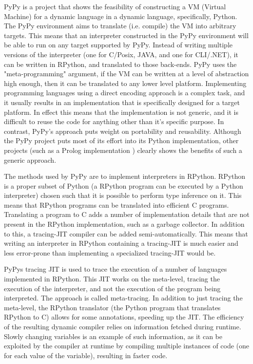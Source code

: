 PyPy is a project that shows the feasibility of constructing a VM (Virtual Machine) 
for a dynamic  language in a dynamic language, specifically, Python. The PyPy 
environment aims to translate (i.e. compile) the VM into arbitrary targets. This 
means that an interpreter constructed in the PyPy environment will be able to 
run on any target supported by PyPy. Instead of writing multiple versions of 
the interpreter (one for C/Posix, JAVA, and one for CLI/.NET), it can be 
written in RPython, and translated to those back-ends. PyPy uses the 
"meta-programming" argument, if the VM can be written at a level of abstraction 
high enough, then it can be translated to any lower level platform. Implementing 
programming languages using a direct encoding approach is a complex task, and it 
usually results in an implementation that is specifically designed for a target platform. 
In effect this means that the implementation is not generic, and it is difficult to 
reuse the code for anything other than it's specific purpose. In contrast, 
PyPy's approach puts weight on portability and reusability\cite{pypy}. Although the
PyPy project puts most of its effort into its Python implementation, other projects
(such as a Prolog implementation \cite{bolz2010towards}) clearly shows the benefits of
such a generic approach.

The methods used by PyPy are to implement interpreters in RPython. RPython is a proper 
subset of Python (a RPython program can be executed by a Python interpreter) 
chosen such that it is possible to perform type inference on it. This
means that RPython programs can be translated into efficient C programs. Translating a 
program to C adds a number of implementation details that are not present in the RPython
implementation, such as a garbage collector. In addition to this, a tracing-JIT compiler 
can be added semi-automatically. This means that writing an interpreter in RPython containing
a tracing-JIT is much easier and less error-prone than implementing a specialized tracing-JIT
would be. 
\cite{bolz2011runtime}

PyPys tracing JIT is used to trace the execution of a number of languages implemented 
in RPython.
This JIT works on the meta-level, tracing the execution of the interpreter, and not the 
execution of the program being interpreted. The approach is called meta-tracing. In addition
to just tracing the meta-level, the RPython translator (the Python program that translates
RPython to C) allows for some annotations, speeding up the JIT. The efficiency of the 
resulting dynamic compiler relies on information fetched during runtime. Slowly changing 
variables is an example of such information, as it can be exploited by the compiler at 
runtime by compiling multiple instances of code (one for each value of the variable),
resulting in faster code. \cite{bolz2011runtime}

